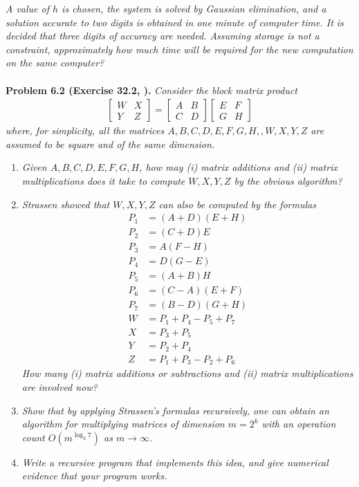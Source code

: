 \documentclass[a4paper,oneside]{book}
\numberwithin{equation}{chapter}
\begin{document}
\textit{A value of $h$ is chosen, the system is solved by Gaussian elimination, and a solution accurate to two digits is obtained in one minute of computer time. It is decided that three digits of accuracy are needed. Assuming storage is not a constraint, approximately how much time will be required for the new computation on the same computer?}\\
\\
\textbf{Problem 6.2 (Exercise 32.2, \cite{1}).} \textit{Consider the block matrix product}
\begin{align}
\left[ {\begin{array}{*{20}{c}}
W&X\\
Y&Z
\end{array}} \right] = \left[ {\begin{array}{*{20}{c}}
A&B\\
C&D
\end{array}} \right]\left[ {\begin{array}{*{20}{c}}
E&F\\
G&H
\end{array}} \right]
\end{align}
\textit{where, for simplicity, all the matrices $A,B,C,D,E,F,G,H,,W,X,Y,Z$ are assumed to be square and of the same dimension.}
\begin{enumerate}
\item \textit{Given $A,B,C,D,E,F,G,H$, how may (i) matrix additions and (ii) matrix multiplications does it take to compute $W,X,Y,Z$ by the obvious algorithm?}
\item \textit{Strassen showed that $W,X,Y,Z$ can also be computed by the formulas}
\begin{align}
{P_1} &= \left( {A + D} \right)\left( {E + H} \right)\\
{P_2} &= \left( {C + D} \right)E\\
{P_3} &= A\left( {F - H} \right)\\
{P_4} &= D\left( {G - E} \right)\\
{P_5} &= \left( {A + B} \right)H\\
{P_6} &= \left( {C - A} \right)\left( {E + F} \right)\\
{P_7} &= \left( {B - D} \right)\left( {G + H} \right)\\
W &= {P_1} + {P_4} - {P_5} + {P_7}\\
X &= {P_3} + {P_5}\\
Y &= {P_2} + {P_4}\\
Z &= {P_1} + {P_3} - {P_2} + {P_6}
\end{align}
\textit{How many (i) matrix additions or subtractions and (ii) matrix multiplications are involved now?}
\item \textit{Show that by applying Strassen's formulas recursively, one can obtain an algorithm for multiplying matrices of dimension $m=2^k$ with an operation count $O\left( {{m^{{{\log }_2}7}}} \right)$ as $m \to \infty $.}
\item \textit{Write a recursive program that implements this idea, and give numerical evidence that your program works.}
\end{enumerate}
\end{document}
